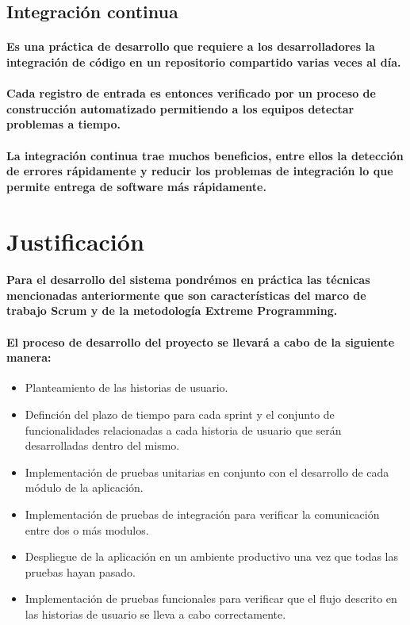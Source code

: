 \subsection{Integración continua}
  \paragraph{Es una práctica de desarrollo que requiere a los desarrolladores la integración de código en un repositorio compartido varias veces al día.}
  \paragraph{Cada registro de entrada es entonces verificado por un proceso de construcción automatizado permitiendo a los equipos detectar problemas a tiempo.}
  \paragraph{La integración continua trae muchos beneficios, entre ellos la detección de errores rápidamente y reducir los problemas de integración lo que permite entrega de software más rápidamente.}\cite{27}

\section{Justificación}

  \paragraph{Para el desarrollo del sistema pondrémos en práctica las técnicas mencionadas anteriormente que son características del marco de trabajo Scrum y de la metodología Extreme Programming.}

  \paragraph{El proceso de desarrollo del proyecto se llevará a cabo de la siguiente manera:}

  \begin{itemize}
    \item Planteamiento de las historias de usuario.
    \item Definción del plazo de tiempo para cada sprint y el conjunto de funcionalidades relacionadas a cada historia de usuario que serán desarrolladas dentro del mismo.  
    \item Implementación de pruebas unitarias en conjunto con el desarrollo de cada módulo de la aplicación. 
    \item Implementación de pruebas de integración para verificar la comunicación entre dos o más modulos.
    \item Despliegue de la aplicación en un ambiente productivo una vez que todas las pruebas hayan pasado.
    \item Implementación de pruebas funcionales para verificar que el flujo descrito en las historias de usuario se lleva a cabo correctamente.
  \end{itemize}

